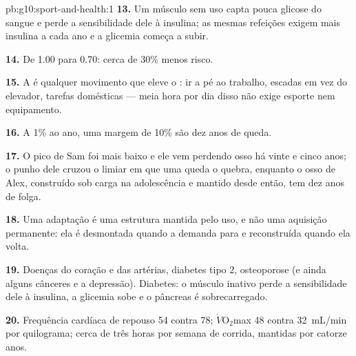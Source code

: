 \begin{solution}{pb:g10:sport-and-health:1}
\textbf{13.} Um músculo sem uso capta pouca glicose do sangue e perde a
sensibilidade dele à insulina; as mesmas refeições exigem mais insulina
a cada ano e a glicemia começa a subir.

\textbf{14.} De 1.00 para 0.70: cerca de 30\% menos risco.

\textbf{15.} A  é qualquer movimento que eleve o : ir a pé ao trabalho, escadas em vez do elevador, tarefas
domésticas --- meia hora por dia disso não exige esporte nem
equipamento.

\textbf{16.} A 1\% ao ano, uma margem de 10\% são dez anos de queda.

\textbf{17.} O pico de Sam foi mais baixo e ele vem perdendo osso há
vinte e cinco anos; o punho dele cruzou o limiar em que uma queda o
quebra, enquanto o osso de Alex, construído sob carga na adolescência e
mantido desde então, tem dez anos de folga.

\textbf{18.} Uma adaptação é uma estrutura mantida pelo uso, e não uma
aquisição permanente: ela é desmontada quando a demanda para e
reconstruída quando ela volta.

\textbf{19.} Doenças do coração e das artérias, diabetes tipo 2,
osteoporose (e ainda alguns cânceres e a depressão). Diabetes: o
músculo inativo perde a sensibilidade dele à insulina, a glicemia sobe e
o pâncreas é sobrecarregado.

\textbf{20.} Frequência cardíaca de repouso 54 contra 78;
$\dot V\!\mathrm{O_2}$max \num{48} contra \qty{32}{mL/min} por
quilograma; cerca de três horas por semana de corrida, mantidas por
catorze anos.
\end{solution}
